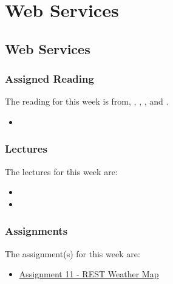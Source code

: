 \clearpage

\renewcommand{\ChapTitle}{Web Services}
\renewcommand{\SectionTitle}{Web Services}

\chapter{\ChapTitle}

\section{\SectionTitle}

\subsection{Assigned Reading}

The reading for this week is from, \AgileBook, \EngSoftBook, \ProGitBook, and \LinuxBook.

\begin{itemize}
    \item {}
\end{itemize}

\subsection{Lectures}

The lectures for this week are:

\begin{itemize}
    \item {}
    \item {}
\end{itemize}

\subsection{Assignments}

The assignment(s) for this week are:

\begin{itemize}
    \item \href{https://github.com/cu-cspb-3308-software-dev-summer-2024/lab-11-QuantumCompiler}{Assignment 11 - REST Weather Map}
\end{itemize}

